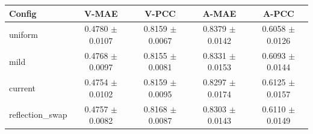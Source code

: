 \begin{tabular}{lcccc}
\toprule
Config & V-MAE & V-PCC & A-MAE & A-PCC \\
\midrule
uniform & 0.4780 $\pm$ 0.0107 & 0.8159 $\pm$ 0.0067 & 0.8379 $\pm$ 0.0142 & 0.6058 $\pm$ 0.0126 \\
mild & 0.4768 $\pm$ 0.0097 & 0.8155 $\pm$ 0.0081 & 0.8331 $\pm$ 0.0153 & 0.6093 $\pm$ 0.0144 \\
current & 0.4754 $\pm$ 0.0102 & 0.8159 $\pm$ 0.0095 & 0.8297 $\pm$ 0.0174 & 0.6125 $\pm$ 0.0157 \\
reflection\_swap & 0.4757 $\pm$ 0.0082 & 0.8168 $\pm$ 0.0087 & 0.8303 $\pm$ 0.0143 & 0.6110 $\pm$ 0.0149 \\
\bottomrule
\end{tabular}
